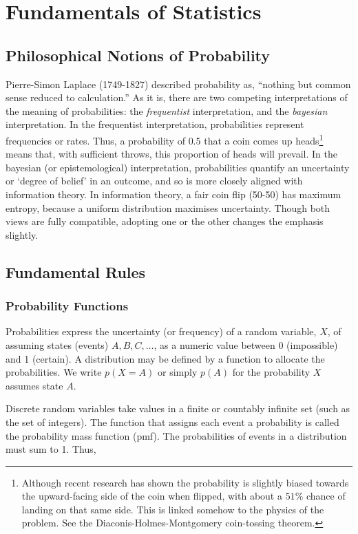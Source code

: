 \documentclass[11pt]{amsart}
\begin{document}
\section{Fundamentals of Statistics}
\subsection{Philosophical Notions of Probability}

Pierre-Simon Laplace (1749-1827) described probability as, ``nothing but common sense reduced to calculation.'' As it is, there are two competing interpretations of the meaning of probabilities: the \emph{frequentist} interpretation, and the \emph{bayesian} interpretation. In the frequentist interpretation, probabilities represent frequencies or rates. Thus, a probability of $0.5$ that a coin comes up heads\footnote{Although recent research has shown the probability is slightly biased towards the upward-facing side of the coin when flipped, with about a $51\%$ chance of landing on that same side. This is linked somehow to the physics of the problem. See the Diaconis-Holmes-Montgomery coin-tossing theorem.} means that, with sufficient throws, this proportion of heads will prevail. In the bayesian (or epistemological) interpretation, probabilities quantify an uncertainty or `degree of belief' in an outcome, and so is more closely aligned with information theory. In information theory, a fair coin flip (50-50) has maximum entropy, because a uniform distribution maximises uncertainty. Though both views are fully compatible, adopting one or the other changes the emphasis slightly.

\subsection{Fundamental Rules}

\subsubsection{Probability Functions}

Probabilities express the uncertainty (or frequency) of a random variable, $X$, of assuming states (events) $A, B, C, \dots$, as a numeric value between 0 (impossible) and 1 (certain). A distribution may be defined by a function to allocate the probabilities. We write $p(X=A)$ or simply $p(A)$ for the probability $X$ assumes state $A$.

Discrete random variables take values in a finite or countably infinite set (such as the set of integers). The function that assigns each event a probability is called the probability mass function (pmf). The probabilities of events in a distribution must sum to 1. Thus,
\end{document}
